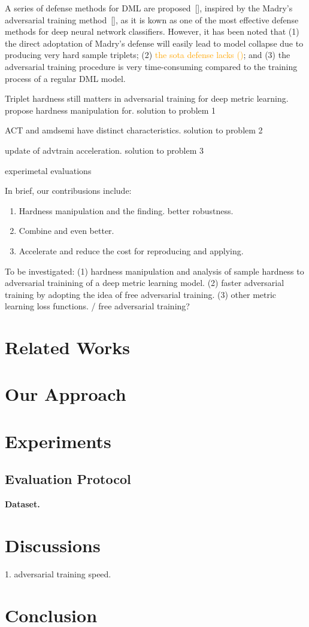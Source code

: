 \documentclass[10pt,twocolumn,letterpaper]{article}
\newcommand{\oo}[1]{\textcolor{orange}{#1}}
\begin{document}
A series of defense methods for DML are proposed~[], inspired by the Madry's
adversarial training method~[], as it is kown as one of the most effective
defense methods for deep neural network classifiers.
%
However, it has been noted that
%
(1) the direct adoptation of Madry's defense will easily lead to model collapse
due to producing very hard sample triplets;
%
(2) \oo{the sota defense lacks ()};
%
and (3) the adversarial training procedure is very time-consuming compared
to the training process of a regular DML model.

Triplet hardness still matters in adversarial training for deep metric
learning.
%
propose hardness manipulation for.
solution to problem 1

ACT and amdsemi have distinct characteristics.
solution to problem 2

update of advtrain acceleration.
solution to problem 3

experimetal evaluations

In brief, our contribusions include:
%
\begin{enumerate}
	\item Hardness manipulation and the finding. better robustness.
	\item Combine and even better.
	\item Accelerate and reduce the cost for reproducing and applying.
\end{enumerate}

To be investigated: (1) hardness manipulation and analysis of sample
hardness to adversarial trainining of a deep metric learning model.
(2) faster adversarial training by adopting the idea of free adversarial
training. (3) other metric learning loss functions. / free adversarial
training?

\section{Related Works}
\label{sec:2}

\section{Our Approach}
\label{sec:3}

\section{Experiments}
\label{sec:4}

\subsection{Evaluation Protocol}

\textbf{Dataset.}

\section{Discussions}
\label{sec:5}

1. adversarial training speed.

\section{Conclusion}
\label{sec:6}

\cite{Authors14}

{\small


}
\end{document}
